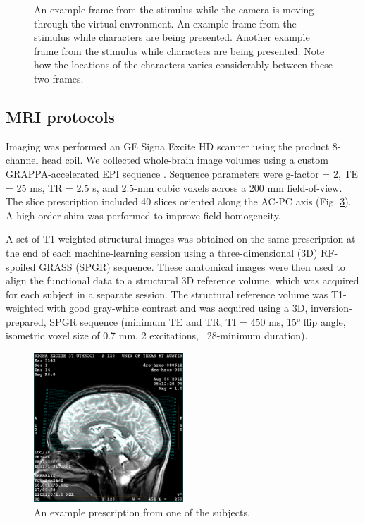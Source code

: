 \documentclass[preprint,authoryear,12pt]{elsarticle}
\begin{document}
\begin{figure}
\begin{subfigure}{0.3\textwidth}
\caption{}
\label{fig:stimulus-location}
\end{subfigure}
\caption{
 An example frame from the stimulus while the camera is moving through the virtual envronment. 
 An example frame from the stimulus while characters are being presented.
 Another example frame from the stimulus while characters are being presented.
Note how the locations of the characters varies considerably between these two frames.}
\label{fig:stimulus}
\end{figure}

\subsection{MRI protocols}
Imaging was performed an GE Signa Excite HD scanner using the product 8-channel head coil.
We collected whole-brain image volumes using a custom GRAPPA-accelerated EPI sequence \citep{newbold}. 
Sequence parameters were g-factor = 2,  TE = 25 ms, TR = 2.5 s, and  2.5-mm cubic voxels across a 200 mm field-of-view. 
The slice prescription included 40 slices oriented along the AC-PC axis (Fig. \ref{fig:rx}). 
A high-order shim was  performed to improve field homogeneity.

A set of T1-weighted structural images was obtained on the same prescription at the end of each machine-learning session using a three-dimensional (3D) RF-spoiled GRASS (SPGR) sequence. 
These anatomical images were then used to align the functional data to a structural 3D reference volume, which was acquired for each subject in a separate session. 
The structural reference volume was T1-weighted with good gray-white contrast and was acquired using a 3D, inversion-prepared, SPGR sequence (minimum TE and TR, TI = 450 ms, 15° flip angle, isometric voxel size of 0.7 mm, 2 excitations, ~28-minimum duration).

\begin{figure}
\centering
\includegraphics[width=0.5\textwidth]{figures/rx}
\caption{An example prescription from one of the subjects.}
\label{fig:rx}
\end{figure}
\end{document}
